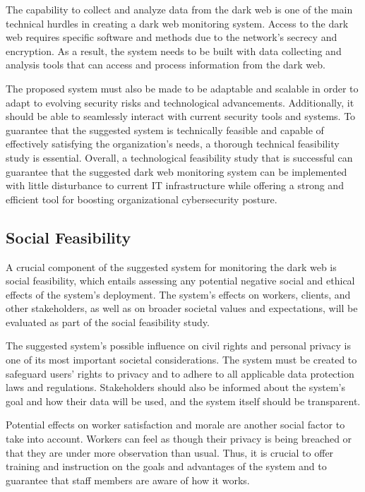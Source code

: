 \documentclass[10pt]{report}
\begin{document}
The capability to collect and analyze data from the dark web is one of the main technical hurdles in creating a dark web monitoring system. Access to the dark web requires specific software and methods due to the network's secrecy and encryption. As a result, the system needs to be built with data collecting and analysis tools that can access and process information from the dark web.

The proposed system must also be made to be adaptable and scalable in order to adapt to evolving security risks and technological advancements. Additionally, it should be able to seamlessly interact with current security tools and systems. To guarantee that the suggested system is technically feasible and capable of effectively satisfying the organization's needs, a thorough technical feasibility study is essential. Overall, a technological feasibility study that is successful can guarantee that the suggested dark web monitoring system can be implemented with little disturbance to current IT infrastructure while offering a strong and efficient tool for boosting organizational cybersecurity posture.

\subsection{Social Feasibility}
A crucial component of the suggested system for monitoring the dark web is social feasibility, which entails assessing any potential negative social and ethical effects of the system's deployment. The system's effects on workers, clients, and other stakeholders, as well as on broader societal values and expectations, will be evaluated as part of the social feasibility study.

The suggested system's possible influence on civil rights and personal privacy is one of its most important societal considerations. The system must be created to safeguard users' rights to privacy and to adhere to all applicable data protection laws and regulations. Stakeholders should also be informed about the system's goal and how their data will be used, and the system itself should be transparent.

Potential effects on worker satisfaction and morale are another social factor to take into account. Workers can feel as though their privacy is being breached or that they are under more observation than usual. Thus, it is crucial to offer training and instruction on the goals and advantages of the system and to guarantee that staff members are aware of how it works.
\end{document}
